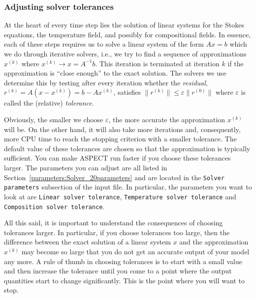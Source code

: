 \documentclass{article}
\newcommand{\aspect}{\textsc{ASPECT}}
\begin{document}
\subsubsection{Adjusting solver tolerances} At the heart of every time step
lies the solution of linear systems for the Stokes equations, the temperature
field, and possibly for compositional fields. In essence, each of these steps
requires us to solve a linear system of the form $Ax=b$ which we do through
iterative solvers, i.e., we try to find a sequence of approximations $x^{(k)}$
where $x^{(k)}\rightarrow x=A^{-1}b$. This iteration is terminated at iteration
$k$ if the approximation is ``close enough'' to the exact solution. The solvers
we use determine this by testing after every iteration whether the
\textit{residual}, $r^{(k)}=A(x-x^{(k)})=b-Ax^{(k)}$, satisfies
$\|r^{(k)}\|\le\varepsilon\|r^{(0)}\|$ where $\varepsilon$ is called the
(relative) \textit{tolerance}.

Obviously, the smaller we choose $\varepsilon$, the more accurate the
approximation $x^{(k)}$ will be. On the other hand, it will also take more
iterations and, consequently, more CPU time to reach the stopping criterion with
a smaller tolerance. The default value of these tolerances are chosen so that
the approximation is typically sufficient. You can make \aspect{} run faster if
you choose these tolerances larger.
The parameters you can adjust are all listed in
Section~\ref{parameters:Solver_20parameters} and are located in the \texttt{Solver parameters} subsection of the input
file. In particular, the parameters you want to look at are \texttt{Linear
solver tolerance}, \texttt{Temperature solver tolerance} and
\texttt{Composition solver tolerance}.

All this said, it is important to understand the consequences of choosing
tolerances larger. In particular, if you choose tolerances too large, then the
difference between the exact solution of a linear system $x$ and the
approximation $x^{(k)}$ may become so large that you do not get an accurate
output of your model any more. A rule of thumb in choosing tolerances is to
start with a small value and then increase the tolerance until you come to a
point where the output quantities start to change significantly. This is the
point where you will want to stop.
\end{document}
